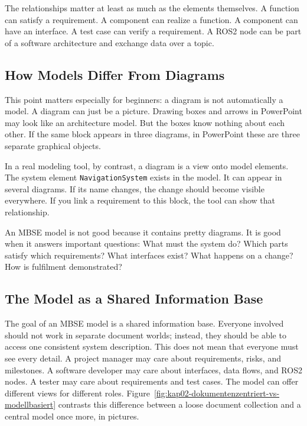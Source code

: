 The relationships matter at least as much as the elements themselves. A function can satisfy a requirement. A component can realize a function. A component can have an interface. A test case can verify a requirement. A ROS2 node can be part of a software architecture and exchange data over a topic.

\subsection{How Models Differ From Diagrams}
This point matters especially for beginners: a diagram is not automatically a model. A diagram can just be a picture. Drawing boxes and arrows in PowerPoint may look like an architecture model. But the boxes know nothing about each other. If the same block appears in three diagrams, in PowerPoint these are three separate graphical objects.

In a real modeling tool, by contrast, a diagram is a view onto model elements. The system element \texttt{NavigationSystem} exists in the model. It can appear in several diagrams. If its name changes, the change should become visible everywhere. If you link a requirement to this block, the tool can show that relationship.

\begin{hinweisbox}
An MBSE model is not good because it contains pretty diagrams. It is good when it answers important questions: What must the system do? Which parts satisfy which requirements? What interfaces exist? What happens on a change? How is fulfilment demonstrated?
\end{hinweisbox}

\subsection{The Model as a Shared Information Base}
The goal of an MBSE model is a shared information base. Everyone involved should not work in separate document worlds; instead, they should be able to access one consistent system description. This does not mean that everyone must see every detail. A project manager may care about requirements, risks, and milestones. A software developer may care about interfaces, data flows, and ROS2 nodes. A tester may care about requirements and test cases. The model can offer different views for different roles. Figure~\ref{fig:kap02-dokumentenzentriert-vs-modellbasiert} contrasts this difference between a loose document collection and a central model once more, in pictures.

